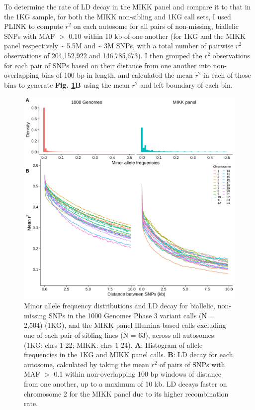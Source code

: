 \documentclass[
]{book}
\begin{document}
To determine the rate of LD decay in the MIKK panel and compare it to that in the 1KG sample, for both the MIKK non-sibling and 1KG call sets, I used PLINK to compute \(r^2\) on each autosome for all pairs of non-missing, biallelic SNPs with MAF \(>\) 0.10 within 10 kb of one another (for 1KG and the MIKK panel respectively \textasciitilde{} 5.5M and \textasciitilde{} 3M SNPs, with a total number of pairwise \(r^2\) observations of 204,152,922 and 146,785,673). I then grouped the \(r^2\) observations for each pair of SNPs based on their distance from one another into non-overlapping bins of 100 bp in length, and calculated the mean \(r^2\) in each of those bins to generate \textbf{Fig. \ref{fig:LDdecay}B} using the mean \(r^2\) and left boundary of each bin.



\begin{figure}
\includegraphics[width=1\linewidth]{figs/mikk_genome/08_ld_decay} \caption{Minor allele frequency distributions and LD decay for biallelic, non-missing SNPs in the 1000 Genomes Phase 3 variant calls (N = 2,504) (1KG), and the MIKK panel Illumina-based calls excluding one of each pair of sibling lines (N = 63), across all autosomes (1KG: chrs 1-22; MIKK: chrs 1-24). \textbf{A}: Histogram of allele frequencies in the 1KG and MIKK panel calls. \textbf{B}: LD decay for each autosome, calculated by taking the mean \(r^2\) of pairs of SNPs with MAF \(>\) 0.1 within non-overlapping 100 bp windows of distance from one another, up to a maximum of 10 kb. LD decays faster on chromosome 2 for the MIKK panel due to its higher recombination rate.}\label{fig:LDdecay}
\end{figure}
\end{document}
